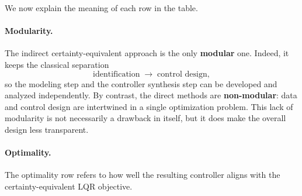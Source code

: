 \begin{table}[h!]
\centering
\small
\renewcommand{\arraystretch}{1.2}
\setlength{\tabcolsep}{4pt}
\caption{Comparison of the main data-driven LQR methods discussed in this chapter.}
\label{tab:dd-lqr-comparison}
\end{table}
We now explain the meaning of each row in the table.

\paragraph{Modularity.}
The indirect certainty-equivalent approach is the only \textbf{modular} one. Indeed, it keeps the
classical separation
\[
\text{identification} \;\longrightarrow\; \text{control design},
\]
so the modeling step and the controller synthesis step can be developed and analyzed
independently. By contrast, the direct methods are \textbf{non-modular}: data and control design are
intertwined in a single optimization problem. This lack of modularity is not necessarily a
drawback in itself, but it does make the overall design less transparent.

\paragraph{Optimality.}
The optimality row refers to how well the resulting controller aligns with the
certainty-equivalent LQR objective.\\

